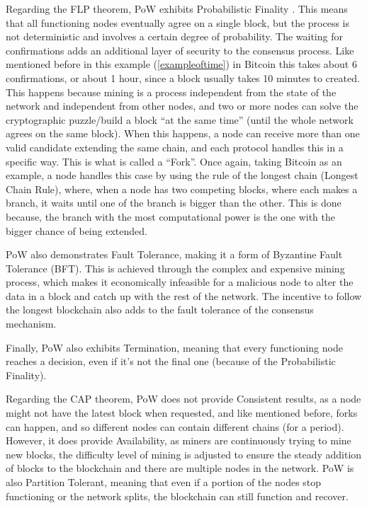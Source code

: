 Regarding the FLP theorem, PoW exhibits Probabilistic Finality \cite{anceaume2020finality}. This means that all functioning nodes eventually agree on a single block, but the process is not deterministic and involves a certain degree of probability. The waiting for confirmations adds an additional layer of security to the consensus process. Like mentioned before in this example (\ref{exampleoftime}) in Bitcoin this takes about 6 confirmations, or about 1 hour, since a block usually takes 10 minutes to created. This happens because mining is a process independent from the state of the network and independent from other nodes, and two or more nodes can solve the cryptographic puzzle/build a block ``at the same time'' (until the whole network agrees on the same block).
When this happens, a node can receive more than one valid candidate extending the same chain, and each protocol handles this in a specific way. This is what is called a ``Fork''.
Once again, taking Bitcoin as an example, a node handles this case by using the rule of the longest chain (Longest Chain Rule), where, when a node has two competing blocks, where each makes a branch, it waits until one of the branch is bigger than the other.
This is done because, the branch with the most computational power is the one with the bigger chance of being extended.

PoW also demonstrates Fault Tolerance, making it a form of Byzantine Fault Tolerance (BFT). This is achieved through the complex and expensive mining process, which makes it economically infeasible for a malicious node to alter the data in a block and catch up with the rest of the network. The incentive to follow the longest blockchain also adds to the fault tolerance of the consensus mechanism.

Finally, PoW also exhibits Termination, meaning that every functioning node reaches a decision, even if it's not the final one (because of the Probabilistic Finality). 

Regarding the CAP theorem, PoW does not provide Consistent results, as a node might not have the latest block when requested, and like mentioned before, forks can happen, and so different nodes can contain different chains (for a period).
However, it does provide Availability, as miners are continuously trying to mine new blocks, the difficulty level of mining is adjusted to ensure the steady addition of blocks to the blockchain and there are multiple nodes in the network.
PoW is also Partition Tolerant, meaning that even if a portion of the nodes stop functioning or the network splits, the blockchain can still function and recover.

